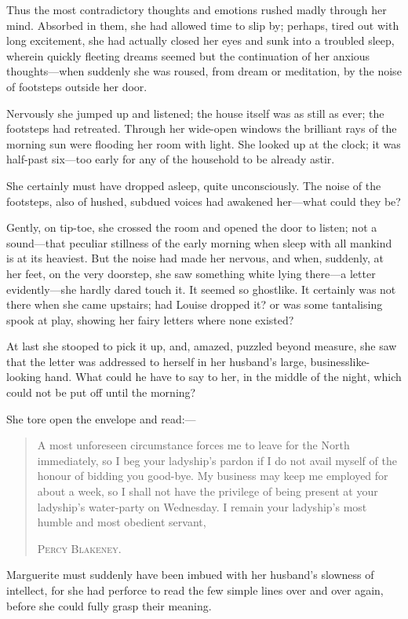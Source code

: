 \documentclass[paper=a5,BCOR=7mm,twoside,DIV=calc,12pt,usegeometry,chapterprefix,endperiod,headings=big]{scrbook}
\begin{document}
Thus the most contradictory thoughts and emotions rushed madly through her mind. Absorbed in them, she had allowed time to slip by; perhaps, tired out with long excitement, she had actually closed her eyes and sunk into a troubled sleep, wherein quickly fleeting dreams seemed but the continuation of her anxious thoughts---when suddenly she was roused, from dream or meditation, by the noise of footsteps outside her door.

Nervously she jumped up and listened; the house itself was as still as ever; the footsteps had retreated. Through her wide-open windows the brilliant rays of the morning sun were flooding her room with light. She looked up at the clock; it was half-past six---too early for any of the household to be already astir.

She certainly must have dropped asleep, quite unconsciously. The noise of the footsteps, also of hushed, subdued voices had awakened her---what could they be?

Gently, on tip-toe, she crossed the room and opened the door to listen; not a sound---that peculiar stillness of the early morning when sleep with all mankind is at its heaviest. But the noise had made her nervous, and when, suddenly, at her feet, on the very doorstep, she saw something white lying there---a letter evidently---she hardly dared touch it. It seemed so ghostlike. It certainly was not there when she came upstairs; had Louise dropped it? or was some tantalising spook at play, showing her fairy letters where none existed?

At last she stooped to pick it up, and, amazed, puzzled beyond measure, she saw that the letter was addressed to herself in her husband's large, businesslike-looking hand. What could he have to say to her, in the middle of the night, which could not be put off until the morning?

She tore open the envelope and read:---
\blockquote{
A most unforeseen circumstance forces me to leave for the North immediately, so I beg your ladyship's pardon if I do not avail myself of the honour of bidding you good-bye. My business may keep me employed for about a week, so I shall not have the privilege of being present at your ladyship's water-party on Wednesday.
{\indent I remain your ladyship's most humble and most obedient servant,}\\
\begin{flushright}
\textsc{Percy Blakeney.}
\end{flushright}
}
Marguerite must suddenly have been imbued with her husband's slowness of intellect, for she had perforce to read the few simple lines over and over again, before she could fully grasp their meaning.
\end{document}
